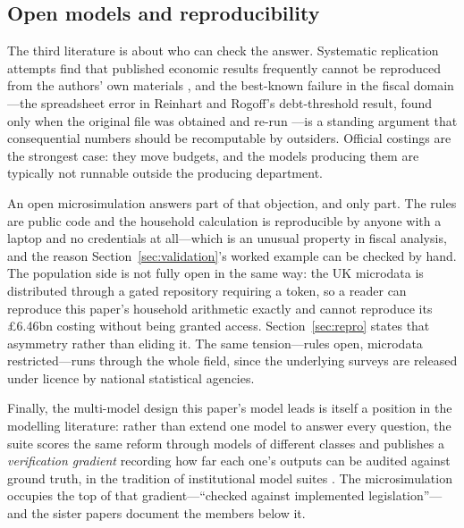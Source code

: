 \subsection{Open models and reproducibility}

The third literature is about who can check the answer. Systematic replication attempts find that published economic results frequently cannot be reproduced from the authors' own materials \citep{chang2015}, and the best-known failure in the fiscal domain---the spreadsheet error in Reinhart and Rogoff's debt-threshold result, found only when the original file was obtained and re-run \citep{herndon2014}---is a standing argument that consequential numbers should be recomputable by outsiders. Official costings are the strongest case: they move budgets, and the models producing them are typically not runnable outside the producing department.

An open microsimulation answers part of that objection, and only part. The rules are public code and the household calculation is reproducible by anyone with a laptop and no credentials at all---which is an unusual property in fiscal analysis, and the reason Section~\ref{sec:validation}'s worked example can be checked by hand. The population side is not fully open in the same way: the UK microdata is distributed through a gated repository requiring a token, so a reader can reproduce this paper's household arithmetic exactly and cannot reproduce its \pounds 6.46bn costing without being granted access. Section~\ref{sec:repro} states that asymmetry rather than eliding it. The same tension---rules open, microdata restricted---runs through the whole field, since the underlying surveys are released under licence by national statistical agencies.

Finally, the multi-model design this paper's model leads is itself a position in the modelling literature: rather than extend one model to answer every question, the suite scores the same reform through models of different classes and publishes a \emph{verification gradient} recording how far each one's outputs can be audited against ground truth, in the tradition of institutional model suites \citep{burgess2013}. The microsimulation occupies the top of that gradient---``checked against implemented legislation''---and the sister papers \citep{ahmadi2026obr, ahmadi2026og} document the members below it.
